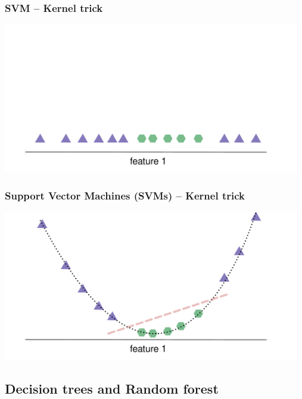 \documentclass[aspectratio=169]{beamer}
\begin{document}
\begin{frame}
  \frametitle{SVM -- Kernel trick}
  \begin{center}
    \includegraphics[width=13.0cm]{images/svm_kernel_trick_2.pdf}
  \end{center}
\end{frame}

\begin{frame}
  \frametitle{Support Vector Machines (SVMs) -- Kernel trick}
  \begin{center}
    \includegraphics[width=13.0cm]{images/svm_kernel_trick_3.pdf}
  \end{center}
\end{frame}

\subsection{Decision trees and Random forest}

\setcounter{tocdepth}{2}
\begin{frame}{}
   \tableofcontents[currentsubsection]
\end{frame}
\end{document}
